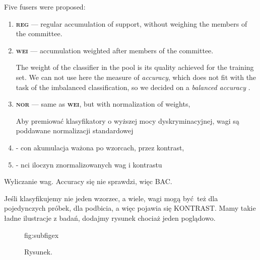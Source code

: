 \documentclass[pmlr]{jmlr}
\begin{document}
Five fusers were proposed:

\begin{enumerate}
	\item \textbf{\textsc{reg}} --- regular accumulation of support, without weighing the members of the committee.
	\item \textbf{\textsc{wei}} --- accumulation weighted after members of the committee.

The weight of the classifier in the pool is its quality achieved for the training set. We can not use here the measure of \emph{accuracy}, which does not fit with the task of the imbalanced classification, so we decided on a \emph{balanced accuracy} \citep{brodersen2010balanced}.

	\item \textbf{\textsc{nor}} --- same as \textbf{\textsc{wei}}, but with normalization of weights,

Aby premiować klasyfikatory o wyższej mocy dyskryminacyjnej, wagi są poddawane normalizacji standardowej
	
	\item - con akumulacja ważona po wzorcach, przez kontrast,
	\item - nci iloczyn znormalizowanych wag i kontrastu
\end{enumerate}



Wyliczanie wag. Accuracy się nie sprawdzi, więc BAC.

Jeśli klasyfikujemy nie jeden wzorzec, a wiele, wagi mogą być też dla pojedynczych próbek, dla podbicia, a więc pojawia się KONTRAST. Mamy takie ładne ilustracje z badań, dodajmy rysunek chociaż jeden poglądowo.

\begin{figure}[!h]
\floatconts
  {fig:subfigex}
  {\caption{Rysunek.}}
  {%
  }
\end{figure}
\end{document}

